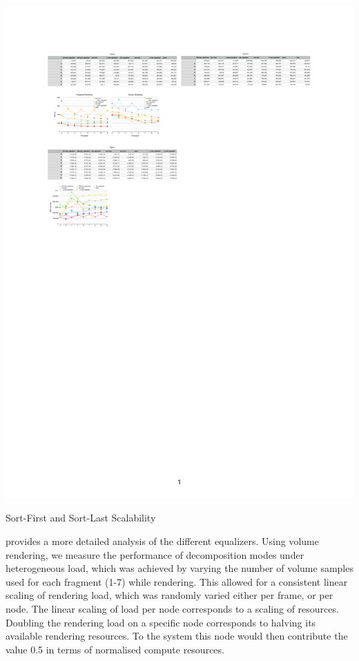 \begin{benchmark}[h!t]
  \includegraphics[width=\textwidth]{results/compounds}
  \caption{\label{rCompounds}Sort-First and Sort-Last Scalability}
\end{benchmark}

 provides a more detailed analysis of the different
equalizers. Using volume rendering, we measure the performance of decomposition
modes under heterogeneous load, which was achieved by varying the
number of volume samples used for each fragment (1-7) while rendering. This
allowed for a consistent linear scaling of rendering load, which was randomly
varied either per frame, or per node. The linear scaling of load per node
corresponds to a scaling of resources. Doubling the rendering load on a
specific node corresponds to halving its available rendering resources. To the
system this node would then contribute the value 0.5 in terms of normalised
compute resources.

